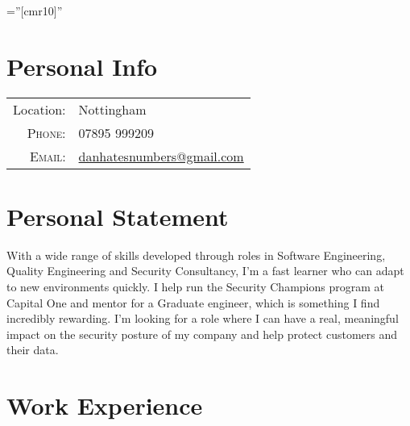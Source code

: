 \documentclass[a4paper,10pt]{article} %
\begin{document}
\pagestyle{empty} %

\font\fb=''[cmr10]'' %


\par{\bigskip\par} %

\section{Personal Info}

\begin{tabular}{rl}
Location: & Nottingham \\
\textsc{Phone:} & 07895 999209\\
\textsc{Email:} & \href{mailto:danhatesnumbers@gmail.com}{danhatesnumbers@gmail.com}
\end{tabular}


\section{Personal Statement}
With a wide range of skills developed through roles in Software Engineering, Quality Engineering and Security Consultancy, I'm a fast learner who can adapt to new environments quickly. I help run the Security Champions program at Capital One and mentor for a Graduate engineer, which is something I find incredibly rewarding.  I'm looking for a role where I can have a real, meaningful impact on the security posture of my company and help protect customers and their data.


\section{Work Experience}
\end{document}

